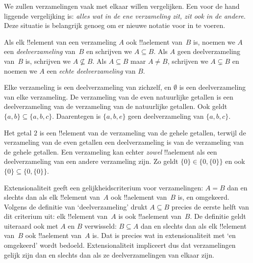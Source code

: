 \documentclass[../../../include/open-logic-section]{subfiles}
\begin{document}

\begin{explain}
We zullen verzamelingen vaak met elkaar willen vergelijken. Een voor de
hand liggende vergelijking is: \emph{alles wat in de ene verzameling
zit, zit ook in de andere}. Deze situatie is belangrijk genoeg om er
nieuwe notatie voor in te voeren.
\end{explain}

\begin{defn}[Deelverzameling]
Als elk !!{element} van een verzameling $A$ ook !!a{element} van~$B$
is, noemen we $A$ een \emph{deelverzameling} van~$B$ en schrijven we
$A \subseteq B$. Als $A$ geen deelverzameling van~$B$ is, schrijven
we $A \not\subseteq B$. Als $A \subseteq B$ maar $A \neq B$, schrijven
we $A \subsetneq B$ en noemen we $A$ een \emph{echte
deelverzameling} van $B$.
\end{defn}

\begin{ex}
Elke verzameling is een deelverzameling van zichzelf, en $\emptyset$
is een deelverzameling van elke verzameling. De verzameling van de even
natuurlijke getallen is een deelverzameling van de verzameling van de
natuurlijke getallen. Ook geldt $\{ a, b \} \subseteq \{ a, b, c \}$.
Daarentegen is $\{ a, b, e \}$ geen deelverzameling van
$\{ a, b, c \}$.
\end{ex}

\begin{ex}
Het getal $2$ is een !!{element} van de verzameling van de gehele
getallen, terwijl de verzameling van de even getallen een
deelverzameling is van de verzameling van de gehele getallen. Een
verzameling kan echter \emph{zowel} !!a{element} als een deelverzameling van
een andere verzameling zijn. Zo geldt $\{0\} \in \{0, \{0\}\}$ en ook
$\{0\} \subseteq \{0, \{0\}\}$.
\end{ex}

Extensionaliteit geeft een gelijkheidscriterium voor verzamelingen:
$A = B$ dan en slechts dan als elk !!{element} van~$A$ ook
!!a{element} van~$B$ is, en omgekeerd. Volgens de definitie van
‘deelverzameling’ drukt $A \subseteq B$ precies de eerste helft van dit
criterium uit: elk !!{element} van~$A$ is ook !!a{element} van~$B$.
De definitie geldt uiteraard ook met $A$ en $B$ verwisseld: $B
\subseteq A$ dan en slechts dan als elk !!{element} van~$B$ ook
!!a{element} van~$A$ is. Dat is precies wat in extensionaliteit met ‘en
omgekeerd’ wordt bedoeld. Extensionaliteit impliceert dus dat
verzamelingen gelijk zijn dan en slechts dan als ze deelverzamelingen
van elkaar zijn.
\end{document}
